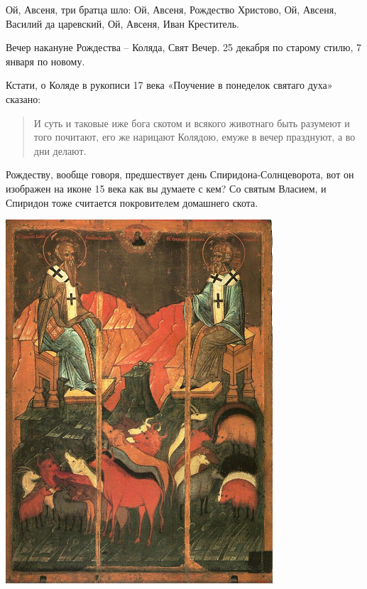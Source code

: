 \noindent
Ой, Авсеня, три братца шло:\newline
 Ой, Авсеня, Рождество Христово, \newline
Ой, Авсеня, Василий да царевский, \newline
Ой, Авсеня, Иван Креститель.\newline

    Вечер накануне Рождества – Коляда, Свят Вечер. 25 декабря по старому стилю, 7 января по новому. 

   Кстати, о Коляде в рукописи 17 века «Поучение в понеделок святаго духа» сказано:

\begin{quotation}
И суть и таковые иже бога скотом и всякого животнаго быть разумеют и того почитают, его же нарицают Колядою, емуже в вечер празднуют, а во дни делают.
\end{quotation}

   Рождеству, вообще говоря, предшествует день Спиридона-Солнцеворота, вот он изображен на иконе 15 века как вы думаете с кем? Со святым Власием, и Спиридон тоже считается покровителем домашнего скота.

\begin{center}
\includegraphics[width=0.80\linewidth]{chast-colebanie-osnov/tur/spiro.jpg}
\end{center}


